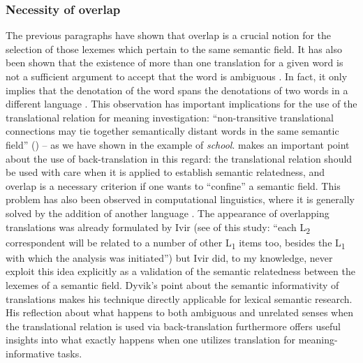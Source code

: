 \subsubsection{Necessity of overlap}
\label{sec:3.4.3.5}
The previous paragraphs have shown that overlap is a crucial notion for the selection of those lexemes which pertain to the same semantic field. It has also been shown that the existence of more than one translation for a given word is not a sufficient argument to accept that the word is ambiguous \citep[30]{langemets_translations_2005}. In fact, it only implies that the denotation of the word spans the denotations of two words in a different language \citep[29]{langemets_translations_2005}. This observation has important implications for the use of the translational relation for meaning investigation: “non-transitive translational connections may tie together semantically distant words in the same semantic field” (\citealt[29]{langemets_translations_2005}) – as we have shown in the example of \textit{school}. \citet[29]{langemets_translations_2005} makes an important point about the use of back-translation in this regard: the translational relation should be used with care when it is applied to establish semantic relatedness, and overlap is a necessary criterion if one wants to ``confine'' a semantic field. This problem has also been observed in computational linguistics, where it is generally solved by the addition of another language \citep{gelbukh_five_2013}. The appearance of overlapping translations was already formulated by Ivir (see  of this study: “each L\textsubscript{2} correspondent will be related to a number of other L\textsubscript{1} items too, besides the L\textsubscript{1} with which the analysis was initiated”) but Ivir did, to my knowledge, never exploit this idea explicitly as a validation of the semantic relatedness between the lexemes of a semantic field. Dyvik’s point about the semantic informativity of translations makes his technique directly applicable for lexical semantic research. His reflection about what happens to both ambiguous and unrelated senses when the translational relation is used via back-translation furthermore offers useful insights into what exactly happens when one utilizes translation for meaning-informative tasks.

